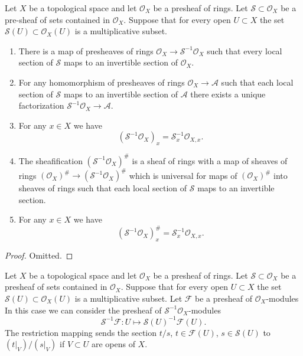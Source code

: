 \begin{lemma}
\label{lemma-simple-invert}
Let $X$ be a topological space and let $\mathcal{O}_X$ be a
presheaf of rings. Let $\mathcal{S} \subset \mathcal{O}_X$
be a pre-sheaf of sets contained in $\mathcal{O}_X$.
Suppose that for every open $U \subset X$ the set
$\mathcal{S}(U) \subset \mathcal{O}_X(U)$ is a multiplicative subset.
\begin{enumerate}
\item There is a map of presheaves of rings
$\mathcal{O}_X \to \mathcal{S}^{-1}\mathcal{O}_X$
such that every local section of $\mathcal{S}$ maps to an invertible
section of $\mathcal{O}_X$.
\item For any homomorphism of presheaves of rings
$\mathcal{O}_X \to \mathcal{A}$ such that each local section
of $\mathcal{S}$ maps to an invertible section of $\mathcal{A}$
there exists a unique factorization
$\mathcal{S}^{-1}\mathcal{O}_X \to \mathcal{A}$.
\item For any $x \in X$ we have
$$
(\mathcal{S}^{-1}\mathcal{O}_X)_x = \mathcal{S}_x^{-1} \mathcal{O}_{X, x}.
$$
\item The sheafification $(\mathcal{S}^{-1}\mathcal{O}_X)^\#$ is a sheaf
of rings with a map of sheaves of rings
$(\mathcal{O}_X)^\# \to (\mathcal{S}^{-1}\mathcal{O}_X)^\#$
which is universal for maps of $(\mathcal{O}_X)^\#$ into sheaves
of rings such that each local section of $\mathcal{S}$ maps
to an invertible section.
\item For any $x \in X$ we have
$$
(\mathcal{S}^{-1}\mathcal{O}_X)^\#_x = \mathcal{S}_x^{-1} \mathcal{O}_{X, x}.
$$
\end{enumerate}
\end{lemma}

\begin{proof}
Omitted.
\end{proof}

\noindent
Let $X$ be a topological space and let $\mathcal{O}_X$ be a
presheaf of rings. Let $\mathcal{S} \subset \mathcal{O}_X$
be a presheaf of sets contained in $\mathcal{O}_X$.
Suppose that for every open $U \subset X$ the set
$\mathcal{S}(U) \subset \mathcal{O}_X(U)$ is a multiplicative subset.
Let $\mathcal{F}$ be a presheaf of $\mathcal{O}_X$-modules
In this case we can consider the presheaf of
$\mathcal{S}^{-1}\mathcal{O}_X$-modules
$$
\mathcal{S}^{-1}\mathcal{F} :
U \longmapsto \mathcal{S}(U)^{-1}\mathcal{F}(U).
$$
The restriction mapping sends the section $t/s$, $t \in \mathcal{F}(U)$,
$s \in \mathcal{S}(U)$ to $(t|_V)/(s|_V)$ if $V \subset U$ are opens
of $X$.

